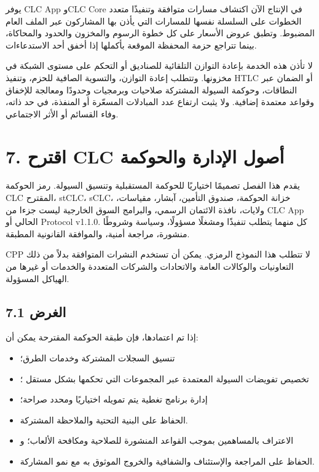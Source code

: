 \documentclass[11pt]{article}
\begin{document}
يوفر CLC App وCLC Core في الإنتاج الآن اكتشاف مسارات متوافقة وتنفيذًا متعدد الخطوات على السلسلة نفسها للمسارات التي يأذن بها المشاركون عبر الملف العام المضبوط. وتطبق عروض الأسعار على كل خطوة الرسوم والمخزون والحدود والمحاكاة، بينما تتراجع حزمة المحفظة الموقعة بأكملها إذا أخفق أحد الاستدعاءات.

لا تأذن هذه الخدمة بإعادة التوازن التلقائية للصناديق أو التحكم على مستوى الشبكة في مخزونها. وتتطلب إعادة التوازن، والتسوية الصافية للحزم، وتنفيذ HTLC أو الضمان عبر النطاقات، وحوكمة السيولة المشتركة صلاحيات وبرمجيات وحدودًا ومعالجة للإخفاق وقواعد معتمدة إضافية. ولا يثبت ارتفاع عدد المبادلات المسعّرة أو المنفذة، في حد ذاته، وفاء القسائم أو الأثر الاجتماعي.


\section*{7. اقترح CLC أصول الإدارة والحوكمة}

يقدم هذا الفصل تصميمًا اختياريًا للحوكمة المستقبلية وتنسيق السيولة. رمز الحوكمة CLC المقترح، stCLC، sCLC، خزانة الحوكمة، صندوق التأمين، آبشار، مقياسات، ولايات، نافذة الائتمان الرسمي، والبرامج السوق الخارجية ليست جزءا من CLC App الحالي أو Protocol v1.1.0. كل منهما يتطلب تنفيذًا ومشغلًا مسؤولًا، وسياسة وشروطًا منشورة، مراجعة أمنية، والموافقة القانونية المطبقة.

CPP لا تتطلب هذا النموذج الرمزي. يمكن أن تستخدم النشرات المتوافقة بدلاً من ذلك التعاونيات والوكالات العامة والاتحادات والشركات المتعددة والخدمات أو غيرها من الهياكل المسؤولة.

\subsection*{7.1 الغرض}

إذا تم اعتمادها، فإن طبقة الحوكمة المقترحة يمكن أن:

\begin{itemize}[leftmargin=*]
\item تنسيق السجلات المشتركة وخدمات الطرق؛
\item تخصيص تفويضات السيولة المعتمدة عبر المجموعات التي تحكمها بشكل مستقل ؛
\item إدارة برنامج تغطية يتم تمويله اختياريًا ومحدد صراحة؛
\item الحفاظ على البنية التحتية والملاحظة المشتركة.
\item الاعتراف بالمساهمين بموجب القواعد المنشورة للصلاحية ومكافحة الألعاب؛ و
\item الحفاظ على المراجعة والإستئناف والشفافية والخروج الموثوق به مع نمو المشاركة.
\end{itemize}
\end{document}

